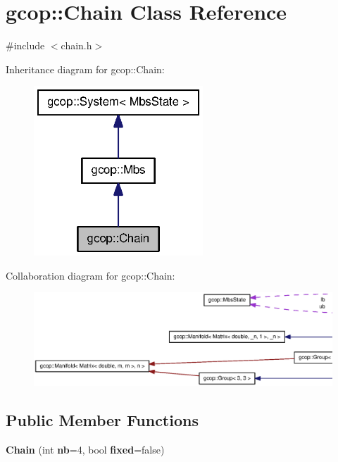 \section{gcop\-:\-:\-Chain \-Class \-Reference}
\label{classgcop_1_1Chain}


{\ttfamily \#include $<$chain.\-h$>$}



\-Inheritance diagram for gcop\-:\-:\-Chain\-:\nopagebreak
\begin{figure}[H]
\begin{center}
\leavevmode
\includegraphics[width=180pt]{classgcop_1_1Chain__inherit__graph}
\end{center}
\end{figure}


\-Collaboration diagram for gcop\-:\-:\-Chain\-:\nopagebreak
\begin{figure}[H]
\begin{center}
\leavevmode
\includegraphics[width=350pt]{classgcop_1_1Chain__coll__graph}
\end{center}
\end{figure}
\subsection*{\-Public \-Member \-Functions}
\begin{DoxyCompactItemize}
\item 
{\bf \-Chain} (int {\bf nb}=4, bool {\bf fixed}=false)
\end{DoxyCompactItemize}


